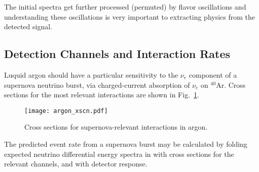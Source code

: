 The initial spectra get further processed (permuted) by flavor oscillations and understanding these oscillations is very important to extracting physics from the detected signal.


\subsection{Detection Channels and Interaction Rates}

Luquid argon should have a particular sensitivity to the $\nu_e$
component of a supernova neutrino burst, via charged-current
absorption of $\nu_e$ on $^{40}$Ar.  Cross sections for the most
relevant interactions are shown in Fig.~\ref{fig:xscns}.

\begin{figure}[!htb]
\centering
\texttt{[image: argon\_xscn.pdf]}
\caption[]{Cross sections for supernova-relevant interactions in argon.}
\label{fig:xscns}
\end{figure}
%
The predicted event rate from a supernova burst may be calculated by
folding expected neutrino differential energy spectra in with cross
sections for the relevant channels, and with detector response.
%


